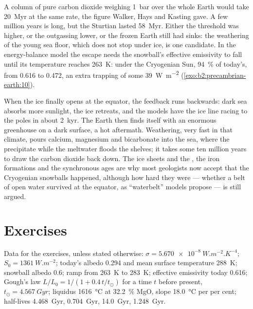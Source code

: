 A column of pure carbon dioxide weighing \qty{1}{bar} over the whole Earth would take
\qty{20}{Myr} at the same rate, the figure Walker, Hays and Kasting gave. A few million years
is long, but the Sturtian lasted \qty{58}{Myr}. Either the threshold was higher, or the
outgassing lower, or the frozen Earth still had sinks: the weathering of the young sea floor,
which does not stop under ice, is one candidate. In the energy-balance model the escape needs
the snowball's effective emissivity to fall until its temperature reaches \qty{263}{K}: under
the Cryogenian Sun, \qty{94}{\percent} of today's, from 0.616 to 0.472, an extra trapping of
some \qty{39}{W.m^{-2}} (\cref{exo:b2:precambrian-earth:10}).

When the ice finally opens at the equator, the feedback runs backwards: dark sea absorbs more
sunlight, the ice retreats, and the models have the ice line racing to the poles in about
\qty{2}{kyr}. The Earth then finds itself with an enormous greenhouse on a dark surface, a hot
aftermath. Weathering, very fast in that climate, pours calcium, magnesium and bicarbonate into
the sea, where the  precipitate while the meltwater floods the shelves; it takes
some ten million years to draw the carbon dioxide back down. The ice sheets and the , the iron formations and the synchronous ages are why most geologists now accept
that the Cryogenian snowballs happened, although how hard they were --- whether a belt of open
water survived at the equator, as ``waterbelt'' models propose --- is still argued.

\section*{Exercises}\label{sec:b2:precambrian-earth:exercises}

Data for the exercises, unless stated otherwise: $\sigma = \qty{5.670e-8}{W.m^{-2}.K^{-4}}$;
$S_0 = \qty{1361}{W.m^{-2}}$; today's albedo 0.294 and mean surface temperature \qty{288}{K};
snowball albedo 0.6; ramp from \qty{263}{K} to \qty{283}{K}; effective emissivity today
0.616; Gough's law $L/L_0 = 1/(1 + 0.4\,t/t_\odot)$ for a time $t$ before present, $t_\odot =
\qty{4.567}{Gyr}$;  liquidus \qty{1616}{\celsius} at \qty{32.2}{\percent} MgO,
slope \qty{18.0}{\celsius} per per cent; half-lives  \qty{4.468}{Gyr}, 
\qty{0.704}{Gyr},  \qty{14.0}{Gyr},  \qty{1.248}{Gyr}.

